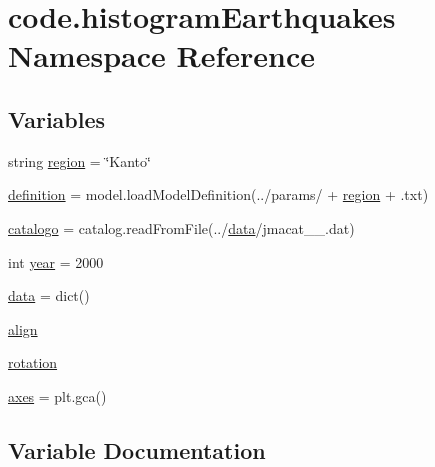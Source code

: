 \hypertarget{namespacecode_1_1histogram_earthquakes}{}\section{code.\+histogram\+Earthquakes Namespace Reference}
\label{namespacecode_1_1histogram_earthquakes}
\subsection*{Variables}
\begin{DoxyCompactItemize}
\item 
string \hyperlink{namespacecode_1_1histogram_earthquakes_a8d5acd7364d7d5da6b9104223f73cdd3}{region} = \char`\"{}Kanto\char`\"{}
\item 
\hyperlink{namespacecode_1_1histogram_earthquakes_adc81e9b14d1098e3bd5fba3606976698}{definition} = model.\+load\+Model\+Definition(\textquotesingle{}../params/\textquotesingle{} + \hyperlink{namespacecode_1_1histogram_earthquakes_a8d5acd7364d7d5da6b9104223f73cdd3}{region} + \textquotesingle{}.txt\textquotesingle{})
\item 
\hyperlink{namespacecode_1_1histogram_earthquakes_a7245ed53d4f7bbb76496ff1c0c6e801a}{catalogo} = catalog.\+read\+From\+File(\textquotesingle{}../\hyperlink{namespacecode_1_1histogram_earthquakes_a120a004790200d063df961c6886f070c}{data}/jmacat\+\_\+\_.\+dat\textquotesingle{})
\item 
int \hyperlink{namespacecode_1_1histogram_earthquakes_aed0ededfb2bbb146ad8759c4e2272d41}{year} = 2000
\item 
\hyperlink{namespacecode_1_1histogram_earthquakes_a120a004790200d063df961c6886f070c}{data} = dict()
\item 
\hyperlink{namespacecode_1_1histogram_earthquakes_ae69ae89f5b16c646b7048cddf0509f53}{align}
\item 
\hyperlink{namespacecode_1_1histogram_earthquakes_ac09cde0a23647e50702de60cea7b6be9}{rotation}
\item 
\hyperlink{namespacecode_1_1histogram_earthquakes_a15d9d08fc160d28bcc2375806e1cea72}{axes} = plt.\+gca()
\end{DoxyCompactItemize}


\subsection{Variable Documentation}
\mbox{\label{namespacecode_1_1histogram_earthquakes_ae69ae89f5b16c646b7048cddf0509f53}} 
